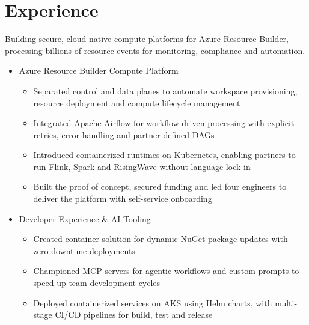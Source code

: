 \section{Experience}
{Building secure, cloud-native compute platforms for Azure Resource Builder, processing billions of resource events for monitoring, compliance and automation.\newline{}
\begin{itemize}
\setlength\itemsep{0.5em}
    \item Azure Resource Builder Compute Platform
        \begin{itemize}
            \item Separated control and data planes to automate workspace provisioning, resource deployment and compute lifecycle management
            \item Integrated Apache Airflow for workflow-driven processing with explicit retries, error handling and partner-defined DAGs
            \item Introduced containerized runtimes on Kubernetes, enabling partners to run Flink, Spark and RisingWave without language lock-in
            \item Built the proof of concept, secured funding and led four engineers to deliver the platform with self-service onboarding
        \end{itemize}
    \item Developer Experience \& AI Tooling
        \begin{itemize}
            \item Created container solution for dynamic NuGet package updates with zero-downtime deployments
            \item Championed MCP servers for agentic workflows and custom prompts to speed up team development cycles
            \item Deployed containerized services on AKS using Helm charts, with multi-stage CI/CD pipelines for build, test and release
        \end{itemize}
\end{itemize}}

